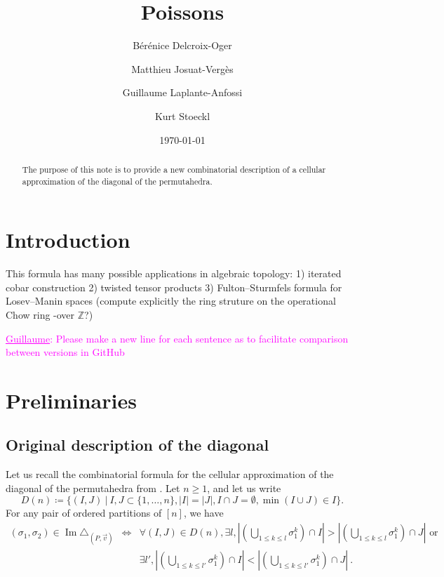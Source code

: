 \documentclass[11pt]{amsart}
\title{Poissons}
\author{B\'er\'enice Delcroix-Oger}
\author{Matthieu Josuat-Verg\`es}
\author{Guillaume Laplante-Anfossi}
\author{Kurt Stoeckl}
\date{\today}
\theoremstyle{definition}
\theoremstyle{remark}
\numberwithin{equation}{section}
\newcommand{\Z}{\mathbb Z}
\newcommand{\0}{\color{blue}{\mathsf{0}}}
\newcommand{\Guillaume}[1]{\textcolor{magenta}{\underline{Guillaume}: #1}}
\DeclareMathOperator{\Ima}{Im} %
\begin{document}

\begin{abstract}
The purpose of this note is to provide a new combinatorial description of a cellular approximation of the diagonal of the permutahedra. 
\end{abstract}


\maketitle

\section{Introduction}

This formula has many possible applications in algebraic topology: 1) iterated cobar construction 2) twisted tensor products 3) Fulton--Sturmfels formula for Losev--Manin spaces (compute explicitly the ring struture on the operational Chow ring -over $\Z$?)


\Guillaume{Please make a new line for each sentence as to facilitate comparison between versions in GitHub}

\section{Preliminaries}

\subsection{Original description of the diagonal}

Let us recall the combinatorial formula for the cellular approximation of the diagonal of the permutahedra from \cite{LA21}.
Let $n\geq 1$, and let us write \[ D(n) \coloneqq \{(I,J) \ | \ I,J\subset\{1,\ldots,n\}, |I|=|J|, I\cap J=\emptyset, \min(I\cup J)\in I \}. \] 
For any pair of ordered partitions of $[n]$, we have
\begin{eqnarray*}
    (\sigma_1,\sigma_2)\in \Ima\triangle_{(P,\vec v)} 
    & \iff & \forall (I,J) \in D(n), \exists l , 
    \left| \left(\bigcup_{1\leq k \leq l} \sigma_1^{k} \right)\cap I \right|
    >
    \left| \left(\bigcup_{1\leq k \leq l} \sigma_1^{k} \right)\cap J \right| \text{ or } \\
    && \exists l' , 
    \left| \left(\bigcup_{1\leq k \leq l'} \sigma_1^{k} \right)\cap I \right|
    <
    \left| \left(\bigcup_{1\leq k \leq l'} \sigma_1^{k} \right)\cap J \right|  \ .
\end{eqnarray*}
\end{document}
